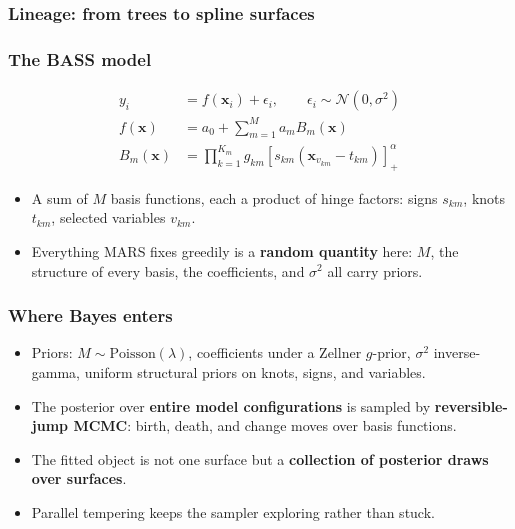 \documentclass[fleqn]{beamer}
\begin{document}
\begin{frame}
  \frametitle{Lineage: from trees to spline surfaces}
  \centering
\end{frame}

\begin{frame}
  \frametitle{The BASS model}
  \begin{align*}
    y_i &= f(\boldsymbol{x}_i) + \epsilon_i, \qquad \epsilon_i \sim \mathcal{N}(0, \sigma^2) \\
    f(\boldsymbol{x}) &= a_0 + \sum_{m=1}^{M} a_m B_m(\boldsymbol{x}) \\
    B_m(\boldsymbol{x}) &= \prod_{k=1}^{K_m} g_{km} \left[ s_{km}\left(\boldsymbol{x}_{v_{km}} - t_{km}\right) \right]^\alpha_+
  \end{align*}
  \begin{itemize}
    \item A sum of $M$ basis functions, each a product of hinge factors: signs $s_{km}$, knots $t_{km}$, selected variables $v_{km}$.
    \item Everything MARS fixes greedily is a \textbf{random quantity} here: $M$, the structure of every basis, the coefficients, and $\sigma^2$ all carry priors.
  \end{itemize}
\end{frame}

\begin{frame}
  \frametitle{Where Bayes enters}
  \begin{itemize}
    \item Priors: $M \sim \text{Poisson}(\lambda)$, coefficients under a Zellner $g$-prior, $\sigma^2$ inverse-gamma, uniform structural priors on knots, signs, and variables.
    \item The posterior over \textbf{entire model configurations} is sampled by \textbf{reversible-jump MCMC}: birth, death, and change moves over basis functions.
    \item The fitted object is not one surface but a \textbf{collection of posterior draws over surfaces}.
    \item Parallel tempering keeps the sampler exploring rather than stuck.
  \end{itemize}
\end{frame}
\end{document}
